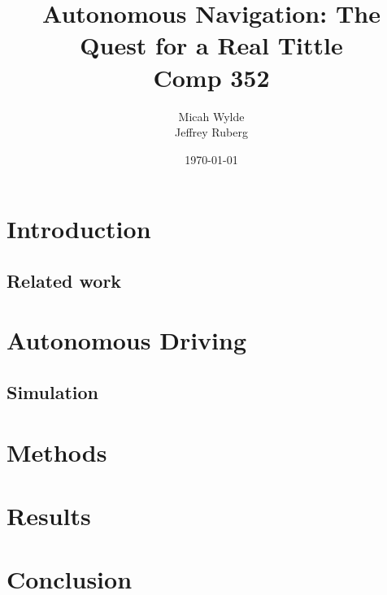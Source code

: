 \documentclass{article}
\author{Micah Wylde\\Jeffrey Ruberg}
\date{\today}
\title{Autonomous Navigation: The Quest for a Real Tittle\\Comp 352}
\begin{document}
\maketitle

\section{Introduction}

\subsection{Related work}

\section{Autonomous Driving}
\subsection{Simulation}


\section{Methods}

\section{Results}

\section{Conclusion}
\end{document}
